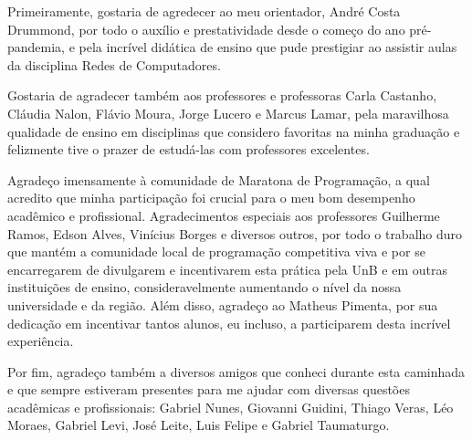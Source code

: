 Primeiramente, gostaria de agredecer ao meu orientador, André Costa Drummond, por todo o auxílio e prestatividade desde o começo do ano pré-pandemia, e pela incrível didática de ensino que pude prestigiar ao assistir aulas da disciplina Redes de Computadores.

Gostaria de agradecer também aos professores e professoras Carla Castanho, Cláudia Nalon, Flávio Moura, Jorge Lucero e Marcus Lamar, pela maravilhosa qualidade de ensino em disciplinas que considero favoritas na minha graduação e felizmente tive o prazer de estudá-las com professores excelentes.

Agradeço imensamente à comunidade de Maratona de Programação, a qual acredito que minha participação foi crucial para o meu bom desempenho acadêmico e profissional. Agradecimentos especiais aos professores Guilherme Ramos, Edson Alves, Vinícius Borges e diversos outros, por todo o trabalho duro que mantém a comunidade local de programação competitiva viva e por se encarregarem de divulgarem e incentivarem esta prática pela UnB e em outras instituições de ensino, consideravelmente aumentando o nível da nossa universidade e da região. Além disso, agradeço ao Matheus Pimenta, por sua dedicação em incentivar tantos alunos, eu incluso, a participarem desta incrível experiência.

Por fim, agradeço também a diversos amigos que conheci durante esta caminhada e que sempre estiveram presentes para me ajudar com diversas questões acadêmicas e profissionais: Gabriel Nunes, Giovanni Guidini, Thiago Veras, Léo Moraes, Gabriel Levi, José Leite, Luis Felipe e Gabriel Taumaturgo.
